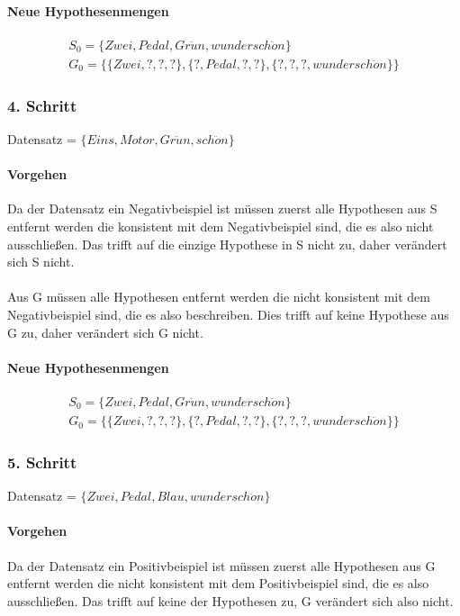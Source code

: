 \documentclass[a4paper]{article}
\begin{document}
\paragraph{Neue Hypothesenmengen}
\begin{align*}
	S_0 = \{Zwei,Pedal,Gr\ddot{u}n,wundersch\ddot{o}n\} \\
	G_0 = \{ \{Zwei,?,?,?\},\{?,Pedal,?,?\}, \{?,?,?,wundersch\ddot{o}n\} \}
\end{align*}

\subsubsection{4. Schritt}
Datensatz = $ \{Eins, Motor, Gr\ddot{u}n, sch\ddot{o}n\} $
\paragraph{Vorgehen}
Da der Datensatz ein Negativbeispiel ist müssen zuerst alle Hypothesen aus S entfernt werden die konsistent mit dem Negativbeispiel sind, die es also nicht ausschließen. Das trifft auf die einzige Hypothese in S nicht zu, daher verändert sich S nicht.
\paragraph{}
Aus G müssen alle Hypothesen entfernt werden die nicht konsistent mit dem Negativbeispiel sind, die es also beschreiben. Dies trifft auf keine Hypothese aus G zu, daher verändert sich G nicht.
\paragraph{Neue Hypothesenmengen}
\begin{align*}
	S_0 = \{Zwei,Pedal,Gr\ddot{u}n,wundersch\ddot{o}n\} \\
	G_0 = \{ \{Zwei,?,?,?\},\{?,Pedal,?,?\}, \{?,?,?,wundersch\ddot{o}n\} \}
\end{align*}

\subsubsection{5. Schritt}
Datensatz = $ \{Zwei, Pedal, Blau, wundersch\ddot{o}n\} $
\paragraph{Vorgehen}
Da der Datensatz ein Positivbeispiel ist müssen zuerst alle Hypothesen aus G entfernt werden die nicht konsistent mit dem Positivbeispiel sind, die es also ausschließen. Das trifft auf keine der Hypothesen zu, G verändert sich also nicht.
\end{document}
